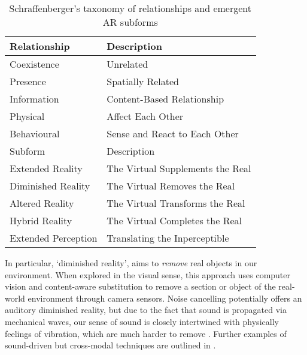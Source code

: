 \begin{table}
    \centering
    \begin{tabular}{ l l }
        \toprule
        Relationship        & Description                       \\
        \midrule
        Coexistence         & Unrelated                         \\
        Presence            & Spatially Related                 \\
        Information         & Content-Based Relationship        \\
        Physical            & Affect Each Other                 \\
        Behavioural         & Sense and React to Each Other     \\
        \midrule
        \midrule
        Subform             & Description                       \\
        \midrule
        Extended Reality    & The Virtual Supplements the Real  \\
        Diminished Reality  & The Virtual Removes the Real      \\
        Altered Reality     & The Virtual Transforms the Real   \\
        Hybrid Reality      & The Virtual Completes the Real    \\
        Extended Perception & Translating the Inperceptible     \\
        \bottomrule
    \end{tabular}
    \caption{Schraffenberger's taxonomy of relationships and emergent AR subforms}\label{table:schraffenbergertaxonomy}
\end{table}

In particular, `diminished reality', aims to \textit{remove} real objects in our environment. When explored in the visual sense, this approach uses computer vision and content-aware substitution to remove a section or object of the real-world environment through camera sensors. Noise cancelling potentially offers an auditory diminished reality, but due to the fact that sound is propagated via mechanical waves, our sense of sound is closely intertwined with physically feelings of vibration, which are much harder to remove \citep{mori2017}. Further examples of sound-driven but cross-modal techniques are outlined in \citep{walther-hansen2020}.

